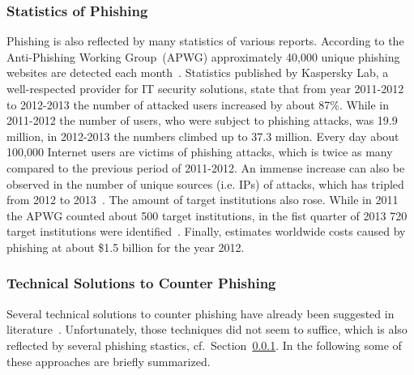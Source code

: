\subsubsection{Statistics of Phishing}
\label{s:stats}
Phishing is also reflected by many statistics of various reports. According to the Anti-Phishing Working Group~(APWG) approximately 40,000 unique phishing websites are detected each month~\cite{antiphishingtrendreport2013}. Statistics published by Kaspersky Lab, a well-respected provider for IT security solutions, state that from year 2011-2012 to 2012-2013 the number of attacked users increased by about 87\%. While in 2011-2012 the number of users, who were subject to phishing attacks, was 19.9 million, in 2012-2013 the numbers climbed up to 37.3 million. Every day about 100,000 Internet users are victims of phishing attacks, which is twice as many compared to the previous period of 2011-2012. An immense increase can also be observed in the number of unique sources (i.e. IPs) of attacks, which has tripled from 2012 to 2013~\cite{kasperskyreport2013}. The amount of target institutions also rose. While in 2011 the APWG counted about 500 target institutions, in the fist quarter of 2013 720 target institutions were identified~\cite{antiphishingglobalreport2013}. Finally, \cite{rsa2013} estimates worldwide costs caused by phishing at about \$1.5 billion for the year 2012.

\subsubsection{Technical Solutions to Counter Phishing}

Several technical solutions to counter phishing have already been suggested in literature~\cite{purkait2012phishing}. Unfortunately, those techniques did not seem to suffice, which is also reflected by several phishing stastics, cf.~Section~\ref{s:stats}. In the following some of these approaches are briefly summarized.


